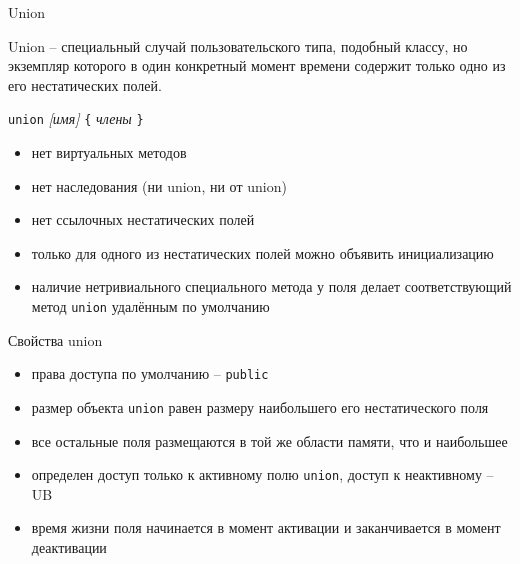 \documentclass[unknownkeysallowed,xcolor=table]{beamer}
\begin{document}
\begin{frame}[fragile]{Union}

Union -- специальный случай пользовательского типа, подобный классу, но экземпляр которого в один конкретный момент времени содержит только одно из его нестатических полей.

\vspace{1em}

\lstinline{union} \emph{[имя]} \lstinline|{| \emph{члены} \lstinline|}|

\vspace{1em}

\begin{itemize}
  \item нет виртуальных методов
  \item нет наследования (ни union, ни от union)
  \item нет ссылочных нестатических полей
  \item только для одного из нестатических полей можно объявить инициализацию
  \item наличие нетривиального специального метода у поля делает соответствующий метод \lstinline{union} удалённым по умолчанию
\end{itemize}

\end{frame}

\begin{frame}{Свойства union}

\begin{itemize}
  \item права доступа по умолчанию -- \lstinline{public} \vspace{0.5em}
  \item размер объекта \lstinline{union} равен размеру наибольшего его нестатического поля \vspace{0.5em}
  \item все остальные поля размещаются в той же области памяти, что и наибольшее \vspace{0.5em}
  \item определен доступ только к активному полю \lstinline{union}, доступ к неактивному -- UB \vspace{0.5em}
  \item время жизни поля начинается в момент активации и заканчивается в момент деактивации
\end{itemize}

\end{frame}
\end{document}
